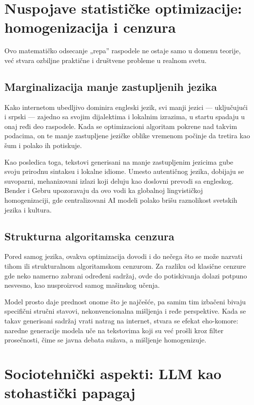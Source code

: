 \documentclass[12pt]{article}
\begin{document}
	\section{Nuspojave statističke optimizacije: homogenizacija i cenzura}
	
	Ovo matematičko odsecanje „repa” raspodele ne ostaje samo u domenu teorije, već stvara ozbiljne praktične i društvene probleme u realnom svetu.
	
	\subsection{Marginalizacija manje zastupljenih jezika}
	Kako internetom ubedljivo dominira engleski jezik, svi manji jezici — uključujući i srpski — zajedno sa svojim dijalektima i lokalnim izrazima, u startu spadaju u onaj ređi deo raspodele. Kada se optimizacioni algoritam pokrene nad takvim podacima, on te manje zastupljene jezičke oblike vremenom počinje da tretira kao šum i polako ih potiskuje.
	
	Kao posledica toga, tekstovi generisani na manje zastupljenim jezicima gube svoju prirodnu sintaksu i lokalne idiome. Umesto autentičnog jezika, dobijaju se suvoparni, mehanizovani izlazi koji deluju kao doslovni prevodi sa engleskog. Bender i Gebru upozoravaju da ovo vodi ka globalnoj lingvističkoj homogenizaciji, gde centralizovani AI modeli polako brišu raznolikost svetskih jezika i kultura.
	
	\subsection{Strukturna algoritamska cenzura}
	Pored samog jezika, ovakva optimizacija dovodi i do nečega što se može nazvati tihom ili strukturalnom algoritamskom cenzurom. Za razliku od klasične cenzure gde neko namerno zabrani određeni sadržaj, ovde do potiskivanja dolazi potpuno nesvesno, kao nusproizvod samog mašinskog učenja. 
	
	Model prosto daje prednost onome što je najčešće, pa samim tim izbačeni bivaju specifični stručni stavovi, nekonvencionalna mišljenja i ređe perspektive. Kada se takav generisani sadržaj vrati natrag na internet, stvara se efekat eho-komore: naredne generacije modela uče na tekstovima koji su već prošli kroz filter prosečnosti, čime se javna debata sužava, a mišljenje homogenizuje.
	
	\section{Sociotehnički aspekti: LLM kao stohastički papagaj}
	
\end{document}
